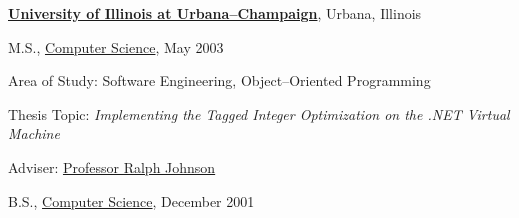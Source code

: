 \documentclass[10pt]{article}
\renewcommand{\section}[2]%
        {\pagebreak[3]\vspace{1.3\baselineskip}%
         \phantomsection\addcontentsline{toc}{section}{#1}%
         \hspace{0in}%
         \marginpar{
         \raggedright \scshape #1}#2}
\newenvironment{outerlist}[1][\enskip\textbullet]%
        {\begin{itemize}[#1]}{\end{itemize}%
         \vspace{-.6\baselineskip}}
\newenvironment{innerlist}[1][\enskip\textbullet]%
        {\begin{compactitem}[#1]}{\end{compactitem}}
\newcommand{\blankline}{\quad\pagebreak[2]}
\begin{document}
\blankline

\href{http://www.uiuc.edu/}{\textbf{University of Illinois at Urbana--Champaign}},
Urbana, Illinois
\begin{outerlist}

\item[] M.S.,
        \href{http://cs.illinois.edu/}
             {Computer Science}, May 2003
        \begin{innerlist}
        \item Area of Study: Software Engineering, Object--Oriented Programming
        \item Thesis Topic: \emph{Implementing the Tagged Integer Optimization on the .NET Virtual Machine}
        \item Adviser:
              \href{http://st-www.cs.illinois.edu/users/johnson/}
                   {Professor Ralph Johnson}
        \end{innerlist}

\item[] B.S.,
        \href{http://cs.illinois.edu/}
             {Computer Science}, December 2001

\end{outerlist}


\end{document}

